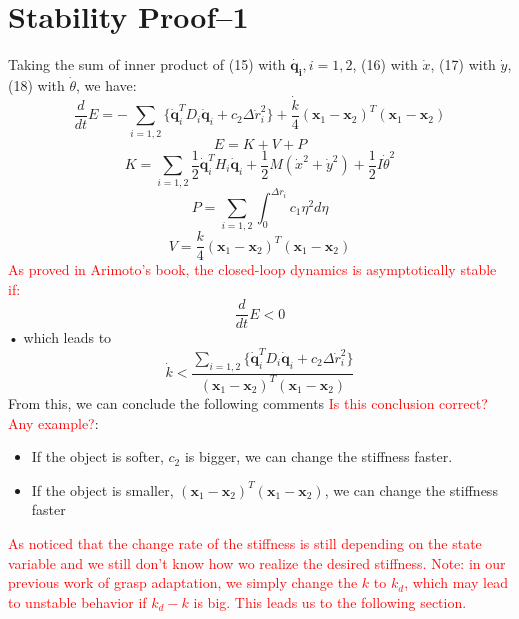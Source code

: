 \documentclass[]{article}
\begin{document}
\section{Stability Proof--1}
Taking the sum of inner product of (15) with $\mathbf{\dot{q_i}},i=1,2$, (16) with $\dot{x}$, (17) with $\dot{y}$, (18) with $\dot{\theta}$, we have:
\begin{equation}
\frac{d}{dt}E=-\sum\limits_{i=1,2}\{\mathbf{\dot{q}}_i^TD_i\mathbf{\dot{q}}_i+c_2\Delta \dot{r}_i^2\}+\frac{\dot{k}}{4}{(\mathbf{x}_1-\mathbf{x}_2)^T(\mathbf{x}_1-\mathbf{x}_2)}
\label{eqn::dE}
\end{equation}
\begin{equation}
E=K+V+P
\end{equation}
\begin{equation}
K=\sum\limits_{i=1,2}\frac{1}{2}\mathbf{\dot{q}}_i^TH_i\mathbf{\dot{q}}_i+\frac{1}{2}
M(\dot{x}^2+\dot{y}^2)+\frac{1}{2}I\dot{\theta}^2
\end{equation}
\begin{equation}
P=\sum\limits_{i=1,2}\int_{0}^{\Delta r_i}c_1\eta^2d\eta
\end{equation}
\begin{equation}
V=\frac{k}{4}(\mathbf{x}_1-\mathbf{x}_2)^T(\mathbf{x}_1-\mathbf{x}_2)
\end{equation}
\textcolor{red}{As proved in Arimoto's book, the closed-loop dynamics is asymptotically stable if:}
\begin{equation}
\frac{d}{dt}E<0
\end{equation}•
which leads to
\begin{equation}
\dot{k}<\frac{\sum\limits_{i=1,2}\{\mathbf{\dot{q}}_i^TD_i\mathbf{\dot{q}}_i+c_2\Delta \dot{r}_i^2\}}{(\mathbf{x}_1-\mathbf{x}_2)^T(\mathbf{x}_1-\mathbf{x}_2)}
\end{equation}
From this, we can conclude the following comments \textcolor{red}{Is this conclusion correct? Any example?}:
\begin{itemize}
\item If the object is softer, $c_2$ is bigger, we can change the stiffness faster.
\item If the object is smaller, $(\mathbf{x}_1-\mathbf{x}_2)^T(\mathbf{x}_1-\mathbf{x}_2)$, we can change the stiffness faster
\end{itemize}
\textcolor{red}{As noticed that the change rate of the stiffness is still depending on the state variable and we still don't know how wo realize the desired stiffness. Note: in our previous work of grasp adaptation, we simply change the $k$ to $k_d$, which may lead to unstable behavior if $k_d-k$ is big. This leads us to the following section.}
\end{document}
